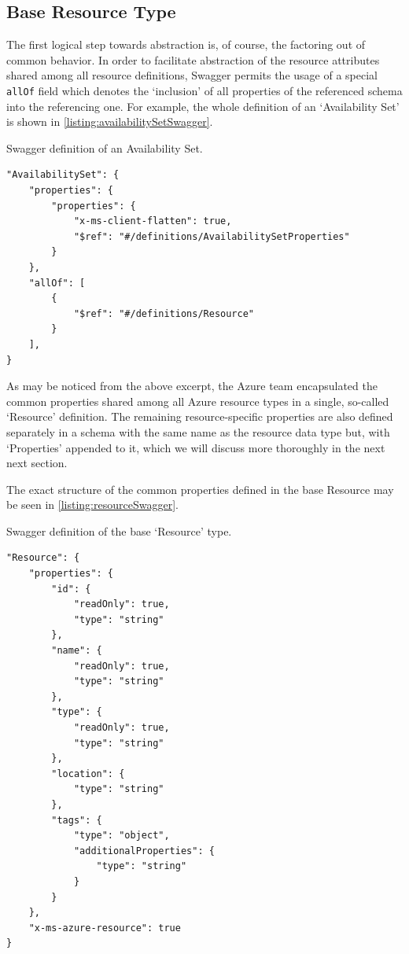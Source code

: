 \documentclass[11pt]{report}
\begin{document}
\subsection{Base Resource Type}

The first logical step towards abstraction is, of course, the factoring out of
common behavior. In order to facilitate abstraction of the resource attributes
shared among all resource definitions, Swagger permits the usage of a special
\texttt{allOf} field which denotes the `inclusion' of all properties of
the referenced schema into the referencing one. For example, the whole
definition of an `Availability Set' is shown in
\autoref{listing:availabilitySetSwagger}.

\begin{listing}[H]
\caption{Swagger definition of an Availability Set.}
\label{listing:availabilitySetSwagger}
\begin{verbatim}
"AvailabilitySet": {
    "properties": {
        "properties": {
            "x-ms-client-flatten": true,
            "$ref": "#/definitions/AvailabilitySetProperties"
        }
    },
    "allOf": [
        {
            "$ref": "#/definitions/Resource"
        }
    ],
}
\end{verbatim}
\end{listing}

As may be noticed from the above excerpt, the Azure team encapsulated the
common properties shared among all Azure resource types in a single, so-called
`Resource' definition. The remaining resource-specific properties are also
defined separately in a schema with the same name as the resource data type
but, with `Properties' appended to it, which we will discuss more thoroughly
in the next next section.

The exact structure of the common properties defined in the base
Resource may be seen in \autoref{listing:resourceSwagger}.

\begin{listing}[H]
\caption{Swagger definition of the base `Resource' type.}
\label{listing:resourceSwagger}
\begin{verbatim}
"Resource": {
    "properties": {
        "id": {
            "readOnly": true,
            "type": "string"
        },
        "name": {
            "readOnly": true,
            "type": "string"
        },
        "type": {
            "readOnly": true,
            "type": "string"
        },
        "location": {
            "type": "string"
        },
        "tags": {
            "type": "object",
            "additionalProperties": {
                "type": "string"
            }
        }
    },
    "x-ms-azure-resource": true
}
\end{verbatim}
\end{listing}
\end{document}
